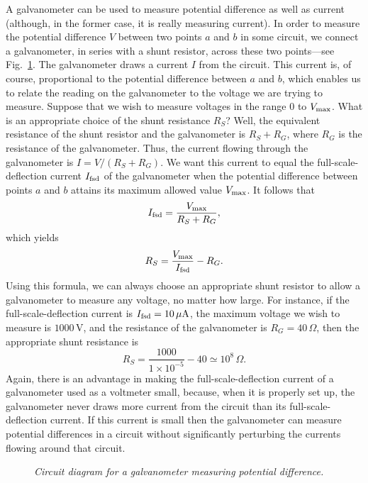 A galvanometer can be used to measure potential difference as well as
current (although, in the former case, it is really measuring current). In
order to measure the potential difference $V$ between two points $a$ and $b$ in
some circuit, we connect a galvanometer, in series with a shunt resistor, across
these two points---see Fig.~\ref{f8.14}. The galvanometer draws a current $I$ from the circuit.
This current is, of course, proportional to the potential difference between
$a$ and $b$, which enables us to relate the reading on  the galvanometer
to the voltage we are trying to measure. Suppose that we wish to measure voltages in
the range 0 to $V_{\rm max}$. What is an appropriate choice of the
shunt resistance $R_S$? Well, the equivalent resistance of the
shunt resistor and the galvanometer is $R_S+R_G$, where $R_G$ is
the resistance of the galvanometer. Thus, the current flowing through the
galvanometer is $I= V/(R_S+R_G)$. We want this current to equal the full-scale-deflection current $I_{\rm fsd}$ of the galvanometer  when the potential
difference between points $a$ and $b$ attains its maximum allowed value
$V_{\rm max}$. It follows that
\begin{equation}
I_{\rm fsd} = \frac{V_{\rm max}}{R_S+R_G},
\end{equation}
which yields
\begin{equation}
R_S = \frac{V_{\rm max}}{I_{\rm fsd}} - R_G.
\end{equation}
Using this formula, we can always choose an appropriate shunt resistor to allow
a galvanometer to measure any voltage, no matter how large. For instance,
if the full-scale-deflection current is $I_{\rm fsd} = 10\,\mu{\rm A}$, 
the maximum voltage we wish to measure is $1000$\,V, and the resistance
of the galvanometer is $R_G = 40\,\Omega$, then the appropriate
shunt resistance is
\begin{equation}
R_S = \frac{1000}{1\times 10^{-5}} - 40 \simeq 10^8\,\Omega.
\end{equation}
Again, there is an advantage in making the full-scale-deflection
current of a galvanometer used as a voltmeter small, because, 
when it is properly set up, the galvanometer never
draws more current from the circuit than its full-scale-deflection current. If
this current is small then the galvanometer can measure potential differences
in a circuit without significantly perturbing the currents flowing
around that circuit. 

\begin{figure}[h]
\epsfysize=2in
\centerline{}
\caption{\em Circuit diagram for a galvanometer measuring potential difference.}\label{f8.14}
\end{figure}

